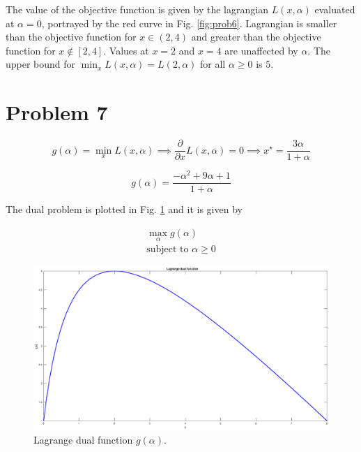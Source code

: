 \documentclass[12pt]{article}
\begin{document}
The value of the objective function is given by the lagrangian $L(x, \alpha)$ evaluated at $\alpha = 0$, portrayed by the red curve in Fig. \ref{fig:prob6}. Lagrangian is smaller than the objective function for $x \in (2, 4)$ and greater than the objective function for $x \notin [2, 4]$. Values at $x = 2$ and $x = 4$ are unaffected by $\alpha$. The upper bound for $\min_x L(x, \alpha) = L(2, \alpha)$ for all $\alpha \geq 0$ is $5$.

\section*{Problem 7}

\begin{equation}
 g(\alpha) = \min_x L(x, \alpha) \implies \frac{\partial}{\partial x} L(x, \alpha) = 0 \implies x^\star = \frac{3 \alpha}{1 + \alpha}
\end{equation}

\begin{equation}
 g(\alpha) = \frac{- \alpha^2 + 9 \alpha + 1}{1 + \alpha}
\end{equation}

The dual problem is plotted in Fig. \ref{fig:dual} and it is given by

\begin{equation}
 \begin{align}
  \max_\alpha g(\alpha) \\
  \text{subject to } \alpha \geq 0
 \end{align}
\end{equation}





\begin{figure}[!ht] \label{fig:dual}
 \center
 \includegraphics[width=\textwidth]{prob7}
 \caption{Lagrange dual function $g(\alpha)$.}
\end{figure}
\end{document}
